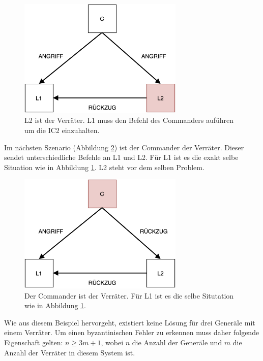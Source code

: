 \documentclass{article}
\begin{document}
\begin{figure}[H]
    \centering
    \includegraphics[width=0.7\textwidth]{general1.png}
    \caption{L2 ist der Verräter. L1 muss den Befehl des Commanders auführen um die IC2 einzuhalten.}
    \label{fig:general1}
\end{figure}

Im nächsten Szenario (Abbildung \ref{fig:general2}) ist der Commander der Verräter. Dieser sendet unterschiedliche 
Befehle an L1 und L2. Für L1 ist es die exakt selbe Situation 
wie in Abbildung \ref{fig:general1}. L2 steht vor dem selben Problem.

\begin{figure}[H]
    \centering
    \includegraphics[width=0.7\textwidth]{general2.png}
    \caption{Der Commander ist der Verräter. Für L1 ist es die selbe Situtation wie in Abbildung \ref{fig:general1}.}
    \label{fig:general2}
\end{figure}

Wie aus diesem Beispiel hervorgeht, existiert keine Lösung für drei Generäle mit einem Verräter. 
Um einen byzantinischen Fehler zu erkennen muss daher folgende Eigenschaft gelten: $n \geq 3m + 1$, 
wobei $n$ die Anzahl der Generäle und $m$ die Anzahl der Verräter in diesem System ist.
\end{document}
